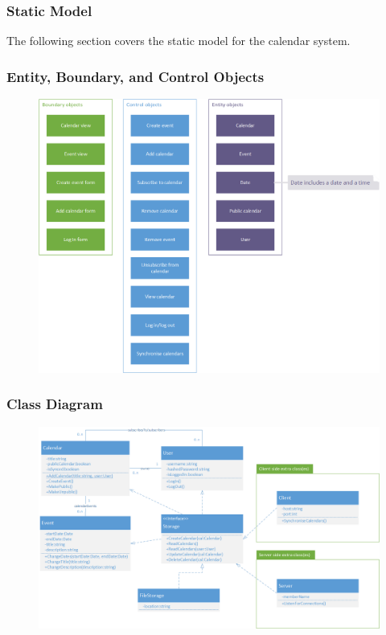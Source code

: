 \subsubsection{Static Model}
The following section covers the static model for the calendar system.

\subsubsection{Entity, Boundary, and Control Objects}
\begin{figure}[h]
\includegraphics[scale=0.8]{entity-boundary-control.png}
\end{figure}

\subsubsection{Class Diagram}
\begin{figure}[h]
\includegraphics[scale=0.6]{class.png}
\end{figure}
\clearpage